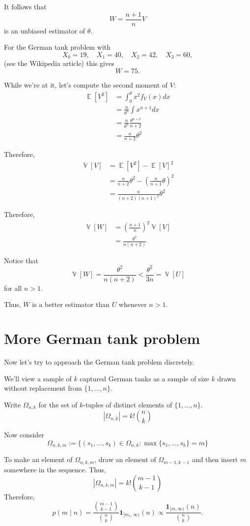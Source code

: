 \documentclass{amsart}
\DeclareMathOperator{\Exp}{\mathbb{E}}
\DeclareMathOperator{\Var}{\mathbb{V}}
\begin{document}
It follows that
\[
W = \frac{n + 1}{n}V
\]
is an unbiased estimator of $\theta$.

For the German tank problem with
\[
X_0=19,\quad X_1=40,\quad X_2=42,\quad X_3=60,
\]
(see the Wikipedia article) this gives
\[
W = 75.
\]

While we're at it, let's compute the second moment of $V$:
\begin{align*}
\Exp[V^2] &= \int_0^\theta x^2 f_V(x)dx\\
&= \frac{n}{\theta^n}\int x^{n + 1}dx\\
&= \frac{n}{\theta^n}\frac{\theta^{n + 2}}{n + 2}\\
&= \frac{n}{n+2}\theta^2
\end{align*}

Therefore,
\begin{align*}
    \Var[V] &= \Exp[V^2] - \Exp[V]^2\\
    &= \frac{n}{n+2}\theta^2 - \left(\frac{n}{n+1}\theta\right)^2\\
    &= \frac{n}{(n + 2)(n + 1)^2}\theta^2
\end{align*}

Therefore,
\begin{align*}
    \Var[W] &= \left(\frac{n+1}{n}\right)^2\Var[V]\\
    &= \frac{\theta^2}{n(n+2)}
\end{align*}

Notice that
\[
\Var[W]=\frac{\theta^2}{n(n+2)} < \frac{\theta^2}{3n} = \Var[U]
\]
for all $n > 1$.

Thus, $W$ is a better estimator than $U$ whenever $n > 1$.

\section{More German tank problem}

Now let's try to approach the German tank problem discretely.

We'll view a sample of $k$ captured German tanks as a sample of size
$k$ drawn without replacement from $\{1, \ldots, n\}$.

Write $\Omega_{n, k}$ for the set of $k$-tuples of distinct elements of $\{1, \ldots, n\}$.
\[
|\Omega_{n, k}| =  k!\binom{n}{k}
\]

Now consider
\[
\Omega_{n, k, m} := \{(s_1,\ldots,s_k)\in\Omega_{n, k} : \max\{s_1,\ldots,s_k\}=m\}
\]

To make an element of $\Omega_{n, k, m}$, draw an element of $\Omega_{m-1, k-1}$
and then insert $m$ somewhere in the sequence.
Thus,
\[
|\Omega_{n, k, m}| = k!\binom{m - 1}{k - 1}
\]
Therefore,
\[
p(m\mid n) = 
\frac{\displaystyle\binom{m-1}{k-1}}{\displaystyle\binom{n}{k}}\mathbf{1}_{[m_s,\infty)}(n)
\propto \frac{\mathbf{1}_{[m,\infty)}(n)}{\displaystyle \binom{n}{k}}.
\]
\end{document}
